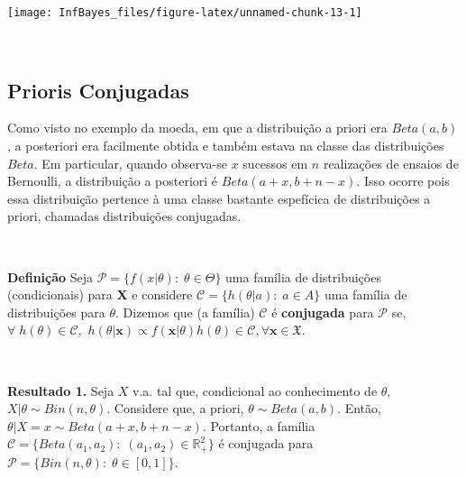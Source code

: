 \documentclass[
]{book}
\newenvironment{Shaded}{\begin{snugshade}}{\end{snugshade}}
\newcommand{\DataTypeTok}[1]{\textcolor[rgb]{0.13,0.29,0.53}{#1}}
\newcommand{\DecValTok}[1]{\textcolor[rgb]{0.00,0.00,0.81}{#1}}
\newcommand{\FloatTok}[1]{\textcolor[rgb]{0.00,0.00,0.81}{#1}}
\newcommand{\KeywordTok}[1]{\textcolor[rgb]{0.13,0.29,0.53}{\textbf{#1}}}
\newcommand{\NormalTok}[1]{#1}
\newcommand{\OperatorTok}[1]{\textcolor[rgb]{0.81,0.36,0.00}{\textbf{#1}}}
\newcommand{\StringTok}[1]{\textcolor[rgb]{0.31,0.60,0.02}{#1}}
\begin{document}
\begin{Shaded}
\end{Shaded}

\begin{center}\texttt{[image: InfBayes\_files/figure-latex/unnamed-chunk-13-1]} \end{center}

\(~\)

\hypertarget{prioris-conjugadas}{%
\subsection{Prioris Conjugadas}\label{prioris-conjugadas}}

Como visto no exemplo da moeda, em que a distribuição a priori era \(Beta(a,b)\), a posteriori era facilmente obtida e também estava na classe das distribuições \(Beta\). Em particular, quando observa-se \(x\) sucessos em \(n\) realizações de ensaios de Bernoulli, a distribuição a posteriori é \(Beta(a+x,b+n-x)\). Isso ocorre pois essa distribuição pertence à uma classe bastante espefícica de distribuições a priori, chamadas distribuições conjugadas.

\(~\)

\textbf{Definição} Seja \(\mathcal{P}=\{f(x|\theta):\;\theta \in \Theta\}\) uma família de distribuições (condicionais) para \(\boldsymbol{X}\) e considere \(\mathcal{C}=\{h(\theta|a):\;a\in A\}\) uma família de distribuições para \(\theta\). Dizemos que (a família) \(\mathcal{C}\) é \textbf{conjugada} para \(\mathcal{P}\) se, \(\forall \;h(\theta)\in \mathcal{C},\) \(h(\theta|\boldsymbol{x})\propto f(\boldsymbol x|\theta)h(\theta) \in \mathcal{C},\forall \boldsymbol x \in \mathfrak{X}.\)

\(~\)

\textbf{Resultado 1.} Seja \(X\) v.a. tal que, condicional ao conhecimento de \(\theta,\) \(X|\theta \sim Bin(n,\theta).\) Considere que, a priori, \(\theta \sim Beta(a,b).\) Então, \(\theta|X=x \sim Beta(a+x,b+n-x).\) Portanto, a família \(\mathcal{C}=\{Beta(a_1,a_2):\;(a_1,a_2)\in \mathbb{R}^2_+\}\) é conjugada para \(\mathcal{P}=\{Bin(n,\theta):\;\theta \in [0,1]\}.\)
\end{document}
